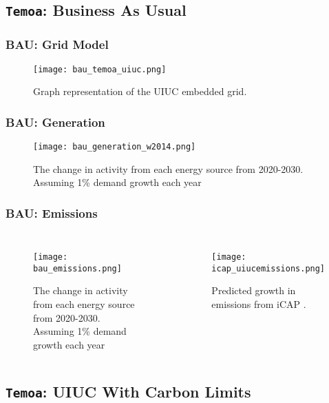 \subsection{\texttt{Temoa}: Business As Usual}
\begin{frame}
  \frametitle{BAU: Grid Model}
  \begin{figure}
    \texttt{[image: bau\_temoa\_uiuc.png]}
    \caption{Graph representation of the UIUC embedded grid.}
    \label{fig:uiucgrid}
  \end{figure}
\end{frame}

\begin{frame}
  \frametitle{BAU: Generation}
      \begin{figure}
        \texttt{[image: bau\_generation\_w2014.png]}
        \caption{The change in activity from each energy source from 2020-2030. Assuming 1\% demand growth each year}
        \label{fig:bau_generation}
      \end{figure}

\end{frame}

\begin{frame}
  \frametitle{BAU: Emissions}
  \begin{columns}
    \column[t]{5cm}
      \begin{figure}
        \texttt{[image: bau\_emissions.png]}
        \caption{The change in activity from each energy source from 2020-2030. Assuming 1\% demand growth each year}
        \label{fig:bau_generation}
      \end{figure}
    \column[t]{5cm}
    \begin{figure}
        \texttt{[image: icap\_uiucemissions.png]}
        \caption{Predicted growth in emissions from iCAP \cite{isee_illinois_2015}.}
        \label{fig:uiuc_emissions}
      \end{figure}
  \end{columns}
\end{frame}

\subsection{\texttt{Temoa}: UIUC With Carbon Limits}

